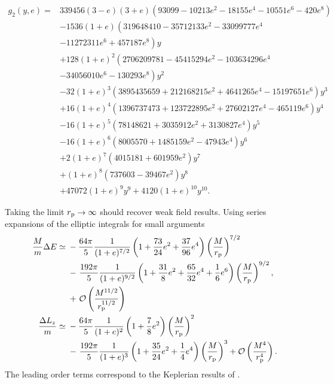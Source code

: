 \begin{align}
g_2(y, e) = {} & 339456 (3 - e) (3 + e) \left(93099 - 10213 e^2 - 18155 e^4 - 10551 e^6 - 420 e^8 \right) \nonumber \\
 {} & - \left. 1536 (1 + e) \left(319648410 - 35712133 e^2 - 33099777 e^4  \right.\right. \nonumber \\
 {} & - \left.\left. 11272311 e^6 +457187 e^8\right) y \right. \nonumber \\
 {} & + \left. 128 (1 + e)^2 \left(2706209781 - 45415294 e^2 - 103634296 e^4 \right.\right. \nonumber \\
 {} & - \left.\left. 34056010 e^6 - 130293 e^8\right) y^2 \right. \nonumber \\
 {} & - \left. 32 (1 + e)^3 \left(3895435659 + 212168215 e^2 + 4641265 e^4 - 15197651 e^6 \right) y^3 \right. \nonumber \\
 {} & + \left. 16 (1 + e)^4 \left(1396737473 + 123722895 e^2 + 27602127 e^4 - 465119 e^6 \right) y^4 \right. \nonumber \\
 {} & - \left. 16 (1 + e)^5 \left(78148621 + 3035912 e^2 + 3130827 e^4\right) y^5 \right. \nonumber \\
 {} & - \left. 16 (1 + e)^6 \left(8005570 + 1485159 e^2 - 47943 e^4\right) y^6 \right. \nonumber \\
 {} & + \left. 2 (1 + e)^7 \left(4015181 + 601959 e^2\right) y^7 \right. \nonumber \\
 {} & + \left. (1 + e)^8 \left(737603 - 39467 e^2\right) y^8 \right. \nonumber \\
 {} & + \left. 47072 (1 + e)^9 y^9 + 4120 (1 + e)^{10} y^{10}. \right.
\end{align}

Taking the limit $r_\mathrm{p} \rightarrow \infty$ should recover weak field results. Using series expansions of the elliptic integrals for small arguments
\begin{align}
\dfrac{M}{m} \Delta E \simeq {} & -\dfrac{64\pi}{5} \dfrac{1}{(1 + e)^{{7}/{2}}} \left(1 + \dfrac{73}{24} e^2 + \dfrac{37}{96} e^{4}\right) \left(\dfrac{M}{r_\mathrm{p}}\right)^{7/2} \nonumber \\
 {} & - \left. \dfrac{192\pi}{5} \dfrac{1}{(1 + e)^{{9}/{2}}} \left(1 + \dfrac{31}{8} e^2 + \dfrac{65}{32} e^4 + \dfrac{1}{6}e^6\right) \left(\dfrac{M}{r_\mathrm{p}}\right)^{9/2}, \right. \nonumber \\*
 {} & + \left. \mathcal{O}\left({\dfrac{M^{11/2}}{r_\mathrm{p}^{11/2}}}\right) \right. \\
\dfrac{\Delta L_{z}}{m} \simeq {} & -\dfrac{64\pi}{5} \dfrac{1}{(1 + e)^{2}} \left(1 + \dfrac{7}{8} e^{2}\right) \left(\dfrac{M}{r_\mathrm{p}}\right)^{2} \nonumber \\
 {} & - \left. \dfrac{192 \pi}{5} \dfrac{1}{(1 + e)^3} \left(1 + \dfrac{35}{24} e^2 + \dfrac{1}{4} e^4\right) \left(\dfrac{M}{r_\mathrm{p}}\right)^{3}  + \mathcal{O}\left({\dfrac{M^{4}}{r_\mathrm{p}^{4}}}\right). \right.
\end{align}
The leading order terms correspond to the Keplerian results of \cite{Peters1964}.

